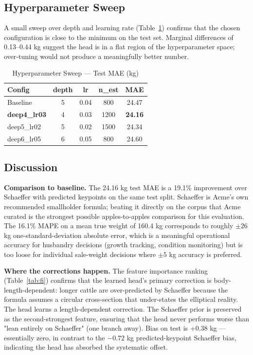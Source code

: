 \documentclass[conference]{IEEEtran}
\begin{document}
\subsection{Hyperparameter Sweep}

A small sweep over depth and learning rate (Table~\ref{tab:sweep}) confirms that the chosen configuration is close to the minimum on the test set. Marginal differences of 0.13--0.44 kg suggest the head is in a flat region of the hyperparameter space; over-tuning would not produce a meaningfully better number.

\begin{table}[!t]
\caption{Hyperparameter Sweep --- Test MAE (kg)}
\label{tab:sweep}
\centering
\begin{tabular}{lcccc}
\toprule
\textbf{Config} & \textbf{depth} & \textbf{lr} & \textbf{n\_est} & \textbf{MAE} \\
\midrule
Baseline               & 5 & 0.04 & 800 & 24.47 \\
\textbf{deep4\_lr03}   & 4 & 0.03 & 1200 & \textbf{24.16} \\
deep5\_lr02            & 5 & 0.02 & 1500 & 24.34 \\
deep6\_lr05            & 6 & 0.05 & 800 & 24.60 \\
\bottomrule
\end{tabular}
\end{table}

\subsection{Discussion}

\textbf{Comparison to baseline.} The 24.16 kg test MAE is a 19.1\% improvement over Schaeffer with predicted keypoints on the same test split. Schaeffer is Acme's own recommended smallholder formula; beating it directly on the corpus that Acme curated is the strongest possible apples-to-apples comparison for this evaluation. The 16.1\% MAPE on a mean true weight of 160.4 kg corresponds to roughly $\pm 26$ kg one-standard-deviation absolute error, which is a meaningful operational accuracy for husbandry decisions (growth tracking, condition monitoring) but is too loose for individual sale-weight decisions where $\pm 5$ kg accuracy is preferred.

\textbf{Where the corrections happen.} The feature importance ranking (Table~\ref{tab:fi}) confirms that the learned head's primary correction is body-length-dependent: longer cattle are over-predicted by Schaeffer because the formula assumes a circular cross-section that under-states the elliptical reality. The head learns a length-dependent correction. The Schaeffer prior is preserved as the second-strongest feature, ensuring that the head never performs worse than "lean entirely on Schaeffer" (one branch away). Bias on test is +0.38 kg --- essentially zero, in contrast to the $-0.72$ kg predicted-keypoint Schaeffer bias, indicating the head has absorbed the systematic offset.
\end{document}
